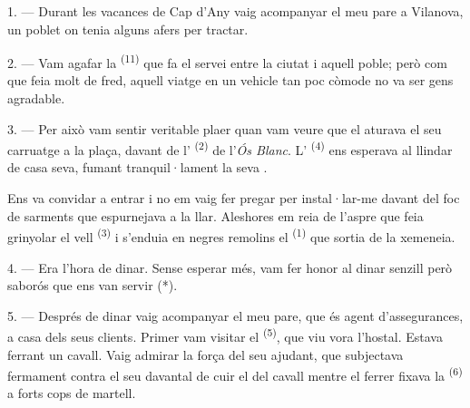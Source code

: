 

\VUsaut{4.0mm}
\VUsaut{3.0mm}
\VUfilet{16mm}
\VUsaut{5.6mm}
\VUsaut{3.0mm}

\VUsaut{3.0mm}

\VUsaut{4.0mm}

1. --- Durant les vacances de Cap d'Any vaig acompanyar el meu pare a Vilanova,
un poblet on tenia alguns afers per tractar.

2. --- Vam agafar la  \textsuperscript{(11)} que fa el servei
entre la ciutat i aquell poble; però com que feia molt de fred, aquell viatge en
un vehicle tan poc còmode no va ser gens agradable.

3. --- Per això vam sentir veritable plaer quan vam veure que el 
aturava el seu carruatge a la plaça, davant de l'
\textsuperscript{(2)} de l'\textit{Ós Blanc}. L'
\textsuperscript{(4)} ens esperava al llindar de casa seva, fumant tranquil·lament
la seva .

Ens va convidar a entrar i no em vaig fer pregar per instal·lar-me davant del foc
de sarments que espurnejava a la llar. Aleshores em reia de l'aspre  que feia grinyolar el vell  \textsuperscript{(3)} i
s'enduia en negres remolins el  \textsuperscript{(1)} que sortia de la
xemeneia.

4. --- Era l'hora de dinar. Sense esperar més, vam fer honor al dinar senzill
però saborós que ens van servir (*).

\VUsaut{3.0mm}

5. --- Després de dinar vaig acompanyar el meu pare, que és agent d'assegurances,
a casa dels seus clients. Primer vam visitar el 
\textsuperscript{(5)}, que viu vora l'hostal. Estava ferrant un cavall. Vaig
admirar la força del seu ajudant, que subjectava fermament contra el seu davantal
de cuir el  del cavall mentre el ferrer fixava la 
\textsuperscript{(6)} a forts cops de martell.

